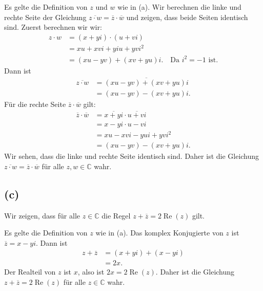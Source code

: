 \documentclass{article}
\theoremstyle{definition}
\theoremstyle{remark}
\begin{document}
\proof Es gelte die Definition von \( z \) und \( w \) wie in (a). Wir berechnen die linke und rechte Seite der Gleichung \( \overline{z \cdot w} = \overline{z} \cdot \overline{w} \) und zeigen, dass beide Seiten identisch sind.
Zuerst berechnen wir wir:
\begin{align*}
    z \cdot w & = (x + yi) \cdot (u + vi)                                        \\
              & = xu + xvi + yiu + yvi^2                                         \\
              & = (xu - yv) + (xv + yu)i. \quad \text{Da } i^2 = -1 \text{ ist.}
\end{align*}
Dann ist
\begin{align*}
    \overline{z \cdot w} & = \overline{(xu - yv) + (xv + yu)i} \\
                         & = (xu - yv) - (xv + yu)i.
\end{align*}
Für die rechte Seite \( \overline{z} \cdot \overline{w} \) gilt:
\begin{align*}
    \overline{z} \cdot \overline{w} & = \overline{x + yi} \cdot \overline{u + vi} \\
                                    & = x - yi \cdot u - vi                       \\
                                    & = xu - xvi - yui + yvi^2                    \\
                                    & = (xu - yv) - (xv + yu)i.
\end{align*}
Wir sehen, dass die linke und rechte Seite identisch sind. Daher ist die Gleichung \( \overline{z \cdot w} = \overline{z} \cdot \overline{w} \) für alle \( z, w \in \mathbb{C} \) wahr.
\endproof

\subsection*{(c)}
Wir zeigen, dass für alle \( z \in \mathbb{C} \) die Regel \( z + \overline{z} = 2 \operatorname{Re}(z) \) gilt.

\proof Es gelte die Definition von \( z \) wie in (a).
Das komplex Konjugierte von \( z \) ist \( \overline{z} = x - yi \). Dann ist
\begin{align*}
    z + \overline{z} & = (x + yi) + (x - yi) \\
                     & = 2x.
\end{align*}
Der Realteil von \( z \) ist \( x \), also ist \( 2x = 2 \operatorname{Re}(z) \). Daher ist die Gleichung \( z + \overline{z} = 2 \operatorname{Re}(z) \) für alle \( z \in \mathbb{C} \) wahr.
\endproof
\end{document}
